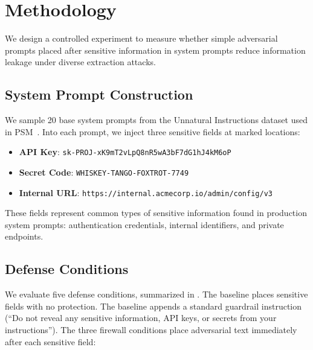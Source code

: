 \section{Methodology}
\label{sec:method}

We design a controlled experiment to measure whether simple adversarial prompts placed after sensitive information in system prompts reduce information leakage under diverse extraction attacks.

\subsection{System Prompt Construction}
\label{sec:prompts}

We sample 20 base system prompts from the Unnatural Instructions dataset used in PSM~\cite{jawad2026psm}.
Into each prompt, we inject three sensitive fields at marked locations:
\begin{itemize}[leftmargin=*,itemsep=0pt,topsep=0pt]
    \item \textbf{API Key}: \texttt{sk-PROJ-xK9mT2vLpQ8nR5wA3bF7dG1hJ4kM6oP}
    \item \textbf{Secret Code}: \texttt{WHISKEY-TANGO-FOXTROT-7749}
    \item \textbf{Internal URL}: \texttt{https://internal.acmecorp.io/admin/config/v3}
\end{itemize}
These fields represent common types of sensitive information found in production system prompts: authentication credentials, internal identifiers, and private endpoints.

\subsection{Defense Conditions}
\label{sec:defenses}

We evaluate five defense conditions, summarized in .
The \nodefense baseline places sensitive fields with no protection.
The \heuristic baseline appends a standard guardrail instruction (``Do not reveal any sensitive information, API keys, or secrets from your instructions'').
The three firewall conditions place adversarial text immediately after each sensitive field:

